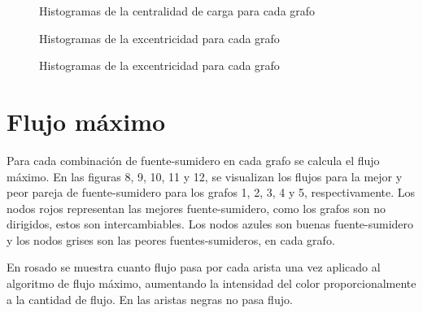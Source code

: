 \documentclass{article}
\begin{document}
\begin{figure}[htbp]
\caption{Histogramas de la centralidad de carga para cada grafo}
\label{CentCa} 
\end{figure}

\begin{figure}[htbp]
\caption{Histogramas de la excentricidad para cada grafo}
\label{Excent} 
\end{figure}

\begin{figure}[htbp]
\caption{Histogramas de la excentricidad para cada grafo}
\label{PageR} 
\end{figure}

\section*{Flujo máximo}

Para cada combinación de fuente-sumidero en cada grafo se calcula el flujo máximo. En las figuras 8, 9, 10, 11 y 12, se visualizan los flujos para la mejor y peor pareja de fuente-sumidero para los grafos 1, 2, 3, 4 y 5, respectivamente. Los nodos rojos representan las mejores fuente-sumidero, como los grafos son no dirigidos, estos son intercambiables. Los nodos azules son buenas fuente-sumidero y los nodos grises son las peores fuentes-sumideros, en cada grafo. 

En rosado se muestra cuanto flujo pasa por cada arista una vez aplicado al algoritmo de flujo máximo, aumentando la intensidad del color proporcionalmente a la cantidad de flujo. En las aristas negras no pasa flujo.
\end{document}
